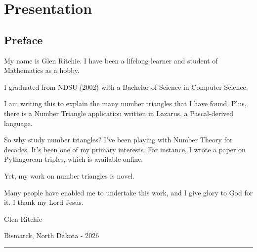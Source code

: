 \documentclass[12pt]{article}
\author{\aaauta}
\title{\aatita}
\newcommand{\aacenterrule}{%
  \begin{center}
    \rule{1in}{0.4pt}%
  \end{center}
}
\begin{document}
 

\maketitle   
 
\tableofcontents

\listoffigures
 
\newpage
{}
 
    \section{Presentation}
    \label{book:01}
 
 
    \subsection{Preface}
    \label{sec:10}
 
     My name is Glen Ritchie. I have been a lifelong learner and student of Mathematics as a 
     hobby.
     
     I graduated from NDSU (2002) with a Bachelor of Science in Computer Science.
     
     I am writing this to explain the many number triangles that I have found. Plus, there is a 
     Number Triangle application written in Lazarus, a Pascal-derived language.
     
     So why study number triangles? I've been playing with Number Theory for decades. It's been 
     one of my primary interests. For instance, I wrote a paper on Pythagorean triples, which is 
     available online.
     
     Yet, my work on number triangles is novel.
     
     Many people have enabled me to undertake this work, and I give glory to God for it. I thank 
     my Lord Jesus.
     
     Glen Ritchie
     
     Bismarck, North Dakota - 2026

    \aacenterrule
 
 
\end{document}
